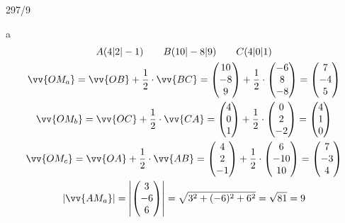 \begin{exercise}{297/9}
  \item [a]
  \begin{gather*}
    A(4|2|-1) \qquad B(10|-8|9) \qquad C(4|0|1) \\
    \vv{OM_a} = \vv{OB} + \frac{1}{2} \cdot \vv{BC} = \begin{pmatrix}10 \\ -8 \\ 9\end{pmatrix} + \frac{1}{2} \cdot \begin{pmatrix}-6 \\ 8 \\ -8\end{pmatrix} = \begin{pmatrix}7 \\ -4 \\ 5\end{pmatrix} \\
    \vv{OM_b} = \vv{OC} + \frac{1}{2} \cdot \vv{CA} = \begin{pmatrix}4 \\ 0 \\ 1\end{pmatrix} + \frac{1}{2} \cdot \begin{pmatrix}0 \\ 2 \\ -2\end{pmatrix} = \begin{pmatrix}4 \\ 1 \\ 0\end{pmatrix} \\
    \vv{OM_c} = \vv{OA} + \frac{1}{2} \cdot \vv{AB} = \begin{pmatrix}4 \\ 2 \\ -1\end{pmatrix} + \frac{1}{2} \cdot \begin{pmatrix}6 \\ -10 \\ 10\end{pmatrix} = \begin{pmatrix}7 \\ -3 \\ 4\end{pmatrix} \\
    |\vv{AM_a}| = \left|\begin{pmatrix}3 \\ -6 \\ 6\end{pmatrix}\right| = \sqrt{3^2 + (-6)^2 + 6^2} = \sqrt{81} = 9 \\

\end{gather*}
\end{exercise}
